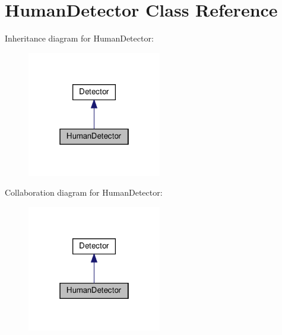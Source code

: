 \hypertarget{classHumanDetector}{}\section{Human\+Detector Class Reference}
\label{classHumanDetector}


Inheritance diagram for Human\+Detector\+:
\nopagebreak
\begin{figure}[H]
\begin{center}
\leavevmode
\includegraphics[width=166pt]{classHumanDetector__inherit__graph}
\end{center}
\end{figure}


Collaboration diagram for Human\+Detector\+:
\nopagebreak
\begin{figure}[H]
\begin{center}
\leavevmode
\includegraphics[width=166pt]{classHumanDetector__coll__graph}
\end{center}
\end{figure}
